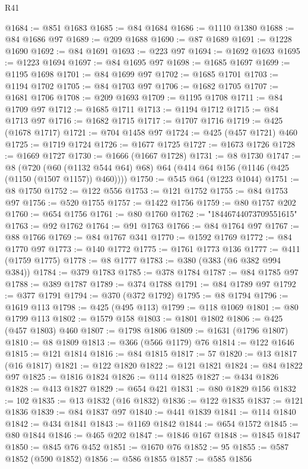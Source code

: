 \begin{lexlean}{R41}
\begin{coremodule}
@1684 := @851 @1683
@1685 := @84 @1684
@1686 := @1110 @1380
@1688 := @84 @1686 @97
@1689 := @209 @1688
@1690 := @87 @1689
@1691 := @1228 @1690
@1692 := @84 @1691
@1693 := @223 @97
@1694 := @1692 @1693
@1695 := @1223 @1694
@1697 := @84 @1695 @97
@1698 := @1685 @1697
@1699 := @1195 @1698
@1701 := @84 @1699 @97
@1702 := @1685 @1701
@1703 := @1194 @1702
@1705 := @84 @1703 @97
@1706 := @1682 @1705
@1707 := @1681 @1706
@1708 := @209 @1693
@1709 := @1195 @1708
@1711 := @84 @1709 @97
@1712 := @1685 @1711
@1713 := @1194 @1712
@1715 := @84 @1713 @97
@1716 := @1682 @1715
@1717 := @1707 @1716
@1719 := @425 (@1678 @1717)
@1721 := @704 @1458 @97
@1724 := @425 (@457 @1721) @460
@1725 := @1719 @1724
@1726 := @1677 @1725
@1727 := @1673 @1726
@1728 := @1669 @1727
@1730 := @1666 (@1667 @1728)
@1731 := @8 @1730
@1747 := @8
    (@720 (@60 (@1132 @544 @64) @68) @64 (@414 @64 @156 (@1146 (@425 (@1150 (@1507 @1157)) @460))))
@1750 := @545 @64 (@1223 @1044)
@1751 := @8 @1750
@1752 := @122 @556
@1753 := @121 @1752
@1755 := @84 @1753 @97
@1756 := @520 @1755
@1757 := @1422 @1756
@1759 := @80 @1757 @202
@1760 := @654 @1756
@1761 := @80 @1760
@1762 := "18446744073709551615"
@1763 := @92 @1762
@1764 := @91 @1763
@1766 := @84 @1764 @97
@1767 := @88 @1766
@1769 := @84 @1767 @341
@1770 := @1592 @1769
@1772 := @84 @1770 @97
@1773 := @140 @1772
@1775 := @1761 @1773 @136
@1777 := @411 (@1759 @1775)
@1778 := @8 @1777
@1783 := @380 (@383 (@6 @382 @994 @384))
@1784 := @379 @1783
@1785 := @378 @1784
@1787 := @84 @1785 @97
@1788 := @389 @1787
@1789 := @374 @1788
@1791 := @84 @1789 @97
@1792 := @377 @1791
@1794 := @370 (@372 @1792)
@1795 := @8 @1794
@1796 := @1619 @113
@1798 := @425 (@495 @113)
@1799 := @118 @1069
@1801 := @80 @1799 @113
@1802 := @1579 @158
@1803 := @1801 @1802
@1806 := @425 (@457 @1803) @460
@1807 := @1798 @1806
@1809 := @1631 (@1796 @1807)
@1810 := @8 @1809
@1813 := @366 (@566 @1179) @76
@1814 := @122 @1646
@1815 := @121 @1814
@1816 := @84 @1815
@1817 := 57
@1820 := @13 @1817 (@16 @1817)
@1821 := @122 @1820
@1822 := @121 @1821
@1824 := @84 @1822 @97
@1825 := @1816 @1824
@1826 := @114 @1825
@1827 := @434 @1826
@1828 := @413 @1827
@1829 := @654 @421
@1831 := @80 @1829 @156
@1832 := 102
@1835 := @13 @1832 (@16 @1832)
@1836 := @122 @1835
@1837 := @121 @1836
@1839 := @84 @1837 @97
@1840 := @441 @1839
@1841 := @114 @1840
@1842 := @434 @1841
@1843 := @1169 @1842
@1844 := @654 @1572
@1845 := @80 @1844
@1846 := @465 @202
@1847 := @1846 @167
@1848 := @1845 @1847
@1850 := @845 @76 @452
@1851 := @1670 @76
@1852 := 95
@1855 := @587 @1852 (@590 @1852)
@1856 := @586 @1855
@1857 := @585 @1856

\end{coremodule}
\end{lexlean}

